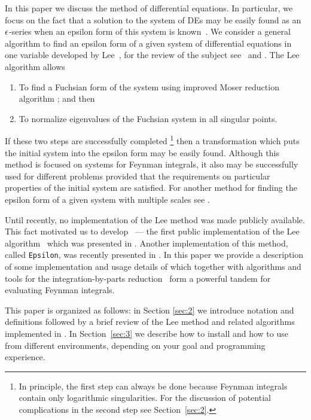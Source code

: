 \documentclass[12pt,a4paper]{article}
\begin{document}
In this paper we discuss the method of differential equations.
In particular, we focus on the fact that a solution to the system of DEs may be easily found as an $\epsilon$-series when an epsilon form of this system is known~\cite{Henn13}.
We consider a general algorithm to find an epsilon form of a given system of differential equations in one variable developed by Lee~\cite{Lee15}, for the review of the subject see~\cite{Henn14} and \cite{Pap14,Tan15,ABB15}.
The Lee algorithm allows
\begin{enumerate}
  \item To find a Fuchsian form of the system using improved Moser reduction algorithm \cite{Mos59}; and then
  \item To normalize eigenvalues of the Fuchsian system in all singular points.
\end{enumerate}
If these two steps are successfully completed%
\footnote{In principle, the first step can always be done because Feynman integrals contain only logarithmic singularities. For the discussion of potential complications in the second step see Section~\ref{sec:2}.}
then a transformation which puts the initial system into the epsilon form may be easily found.
Although this method is focused on systems for Feynman integrals, it also may be successfully used for different problems provided that the requirements on particular properties of the initial system are satisfied.
For another method for finding the epsilon form of a given system with multiple scales see \cite{Mey16a,Mey16b}.

Until recently, no implementation of the Lee method was made publicly available.
This fact motivated us to develop \fuchsia \ --- the first public implementation of the Lee algorithm~\cite{Lee15} which was presented in \cite{GM16}.
Another implementation of this method, called \texttt{Epsilon}, was recently presented in \cite{Pra17}.
In this paper we provide a description of some implementation and usage details of \fuchsia which together with algorithms and tools for the integration-by-parts reduction~\cite{Lap00,Smi08,MS12,Lee12,Lee13,SS13,Smi14,GLZ16} form a powerful tandem for evaluating Feynman integrals.

This paper is organized as follows: in Section \ref{sec:2} we introduce notation and definitions followed by a brief review of the Lee method and related algorithms implemented in \fuchsia.
In Section~\ref{sec:3} we describe how to install and how to use \fuchsia from different environments, depending on your goal and programming experience.
\end{document}

